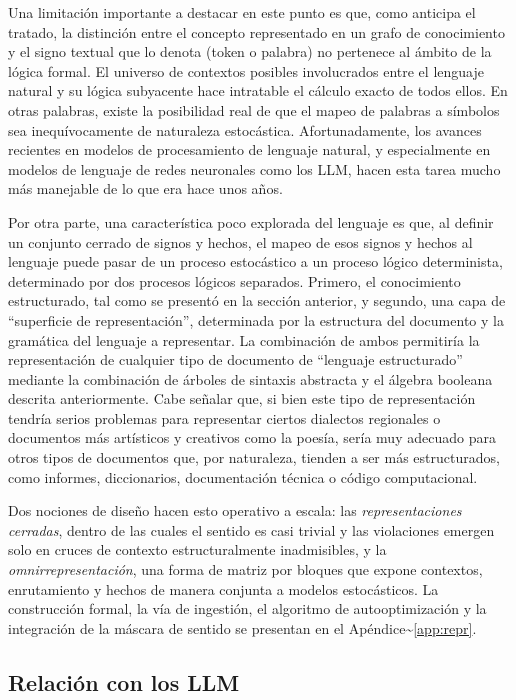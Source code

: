 \documentclass{article}
\begin{document}
Una limitación importante a destacar en este punto es que, como anticipa
el tratado, la distinción entre el concepto representado en un grafo de
conocimiento y el signo textual que lo denota (token o palabra) no
pertenece al ámbito de la lógica formal. El universo de contextos
posibles involucrados entre el lenguaje natural y su lógica subyacente
hace intratable el cálculo exacto de todos ellos. En otras palabras,
existe la posibilidad real de que el mapeo de palabras a símbolos sea
inequívocamente de naturaleza estocástica. Afortunadamente, los avances
recientes en modelos de procesamiento de lenguaje natural, y
especialmente en modelos de lenguaje de redes neuronales como los LLM,
hacen esta tarea mucho más manejable de lo que era hace unos años.

Por otra parte, una característica poco explorada del lenguaje es que,
al definir un conjunto cerrado de signos y hechos, el mapeo de esos
signos y hechos al lenguaje puede pasar de un proceso estocástico a un
proceso lógico determinista, determinado por dos procesos lógicos
separados. Primero, el conocimiento estructurado, tal como se presentó
en la sección anterior, y segundo, una capa de ``superficie de
representación'', determinada por la estructura del documento y la
gramática del lenguaje a representar. La combinación de ambos permitiría
la representación de cualquier tipo de documento de ``lenguaje
estructurado'' mediante la combinación de árboles de sintaxis abstracta
y el álgebra booleana descrita anteriormente. Cabe señalar que, si bien
este tipo de representación tendría serios problemas para representar
ciertos dialectos regionales o documentos más artísticos y creativos
como la poesía, sería muy adecuado para otros tipos de documentos que,
por naturaleza, tienden a ser más estructurados, como informes,
diccionarios, documentación técnica o código computacional.

Dos nociones de diseño hacen esto operativo a escala: las
\emph{representaciones cerradas}, dentro de las cuales el sentido es
casi trivial y las violaciones emergen solo en cruces de contexto
estructuralmente inadmisibles, y la \emph{omnirrepresentación}, una
forma de matriz por bloques que expone contextos, enrutamiento y hechos
de manera conjunta a modelos estocásticos. La construcción formal, la
vía de ingestión, el algoritmo de autooptimización y la integración de
la máscara de sentido se presentan en el
Apéndice\textasciitilde{}\ref{app:repr}.

\hypertarget{relaciuxf3n-con-los-llm}{%
\subsection{Relación con los LLM}\label{relaciuxf3n-con-los-llm}}
\end{document}
